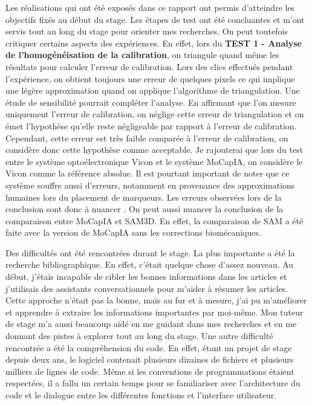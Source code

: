        Les réalisations qui ont été exposés dans ce rapport ont permis d'atteindre les objectifs fixés au début du stage. Les étapes de test ont été concluantes et m'ont servis tout au long du stage pour orienter mes recherches. On peut toutefois critiquer certains aspects des expériences. En effet, lors du \textbf{TEST 1 - Analyse de l'homogénéisation de la calibration}, on triangule quand même les résultats pour calculer l'erreur de calibration. Lors des clics effectués pendant l'expérience, on obtient toujours une erreur de quelques pixels ce qui implique une légère approximation quand on applique l'algorithme de triangulation. Une étude de sensibilité pourrait compléter l'analyse. En affirmant que l'on mesure uniquement l'erreur de calibration, on néglige cette erreur de triangulation et on émet l'hypothèse qu'elle reste négligeable par rapport à l'erreur de calibration. Cependant, cette erreur est très faible comparée à l'erreur de calibration, on considère donc cette hypothèse comme acceptable. Je rajouterai que lors du test entre le système optoélectronique Vicon et le système MoCapIA, on considère le Vicon comme la référence absolue. Il est pourtant important de noter que ce système souffre aussi d'erreurs, notamment en provenance des approximations humaines lors du placement de marqueurs. Les erreurs observées lors de la conclusion sont donc à nuancer \cite{MarkerlessforBiomecha}. On peut aussi nuancer la conclusion de la comparaison entre MoCapIA et SAM3D. En effet, la comparaison de SAM a été faite avec la version de MoCapIA sans les corrections biomécaniques.

        Des difficultés ont été rencontrées durant le stage. La plus importante a été la recherche bibliographique. En effet, c'était quelque chose d'assez nouveau. Au début, j'étais incapable de cibler les bonnes informations dans les articles et j'utilisais des assistants conversationnels pour m'aider à résumer les articles. Cette approche n'était pas la bonne, mais au fur et à mesure, j'ai pu m'améliorer et apprendre à extraire les informations importantes par moi-même. Mon tuteur de stage m'a aussi beaucoup aidé en me guidant dans mes recherches et en me donnant des pistes à explorer tout au long du stage. Une autre difficulté rencontrée a été la compréhension du code. En effet, étant un projet de stage depuis deux ans, le logiciel contenait plusieurs dizaines de fichiers et plusieurs milliers de lignes de code. Même si les conventions de programmations étaient respectées, il a fallu un certain temps pour se familiariser avec l'architecture du code et le dialogue entre les différentes fonctions et l'interface utilisateur.

